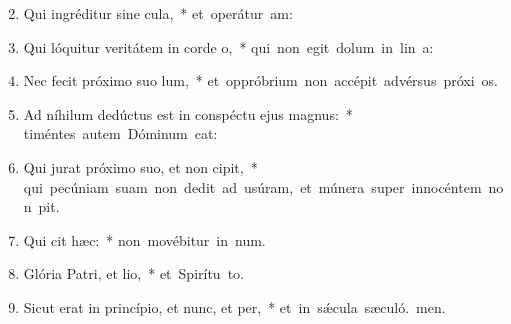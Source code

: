 \begin{flushleft}
\begin{enumerate}[leftmargin=*]
\setcounter{enumi}{1}

\item Qui ingréditur sine cula,~* \mbox{et operátur am:}

\item Qui lóquitur veritátem in corde o,~* \mbox{qui non egit dolum in lin a:}

\item Nec fecit próximo suo lum,~* \mbox{et oppróbrium non accépit advérsus próxi os.}

\item Ad níhilum dedúctus est in conspéctu ejus magnus:~* \mbox{timéntes autem Dóminum cat:}

\item Qui jurat próximo suo, et non cipit,~* \mbox{qui pecúniam suam non dedit ad usúram, et múnera super innocéntem non pit.}

\item Qui cit hæc:~* \mbox{non movébitur in num.}

\item Glória Patri, et lio,~* \mbox{et Spirítu to.}

\item Sicut erat in princípio, et nunc, et per,~* \mbox{et in sǽcula sæculó. men.}

\end{enumerate}
\end{flushleft}